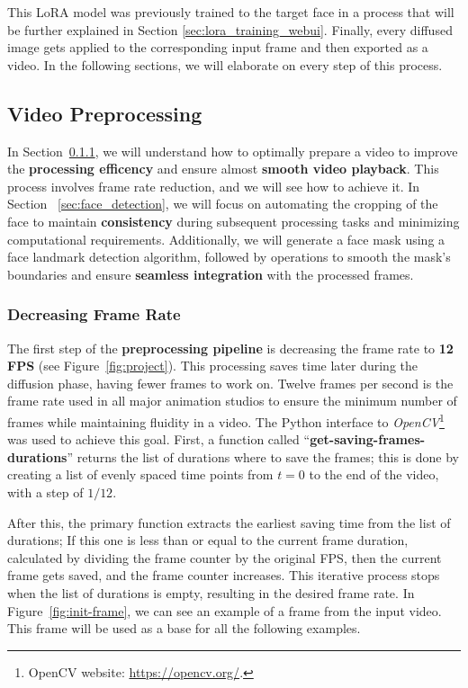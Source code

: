 \documentclass[preprint]{elsarticle}
\begin{document}
This LoRA model was previously trained to the target face in a process that will be further explained in Section \ref{sec:lora_training_webui}.  Finally, every diffused image gets applied to the corresponding input frame and then exported as a video. In the following sections, we will elaborate on every step of this process. 



\subsection{Video Preprocessing} \label{sec:video_preprocessing}

In Section~\ref{sec:decreasing_frame_rate}, we will understand how to optimally prepare a video to improve the \textbf{processing efficency} and ensure almost \textbf{smooth video playback}. This process involves frame rate reduction, and we will see how to achieve it.
In Section ~\ref{sec:face_detection}, we will focus on automating the cropping of the face to maintain \textbf{consistency} during subsequent processing tasks and minimizing computational requirements. Additionally, we will generate a face mask using a face landmark detection algorithm, followed by operations to smooth the mask's boundaries and ensure \textbf{seamless integration} with the processed frames.



\subsubsection{Decreasing Frame Rate}\label{sec:decreasing_frame_rate}

The first step of the \textbf{preprocessing pipeline} is decreasing the frame rate to \textbf{12 FPS} (see Figure~\ref{fig:project}). 
This processing saves time later during the diffusion phase, having fewer frames to work on. 
Twelve frames per second is the frame rate used in all major animation studios to ensure the minimum number of  frames while maintaining fluidity in a video. The Python interface to \emph{OpenCV}\footnote{OpenCV website: \url{https://opencv.org/}.} 
was used to achieve this goal.  First, a function called ``\textbf{get-saving-frames-durations}'' returns the list of durations where to save the frames; this is done by creating a list of evenly spaced time points from $t=0$ to the end of the video, with a step of $1/12$. 

After this, the primary function extracts the earliest saving time from the list of durations; 
If this one is less than or equal to the current frame duration, calculated by dividing the frame counter by the original FPS,  then the current frame gets saved, and the frame counter increases. This iterative process stops when the list of durations is empty, resulting in the desired frame rate. In Figure~\ref{fig:init-frame}, we can see an example of a frame from the input video. This frame will be used as a base for all the following examples.
\end{document}
